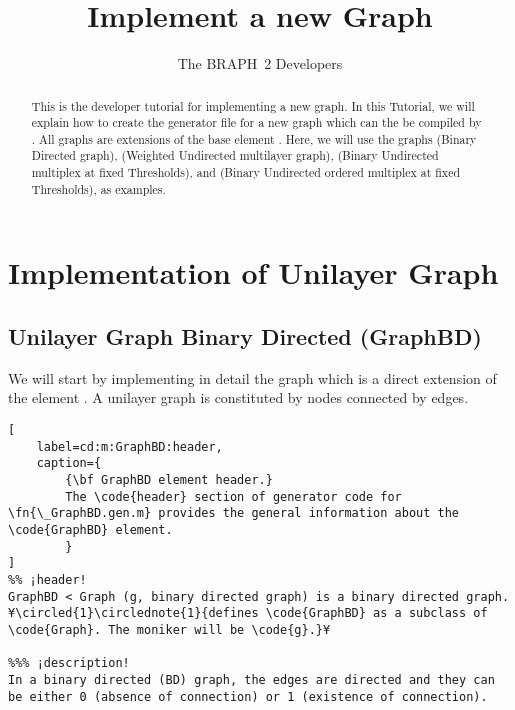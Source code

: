\documentclass{tufte-handout}
\title{Implement a new Graph}
\author[The BRAPH~2 Developers]{The BRAPH~2 Developers}
\begin{document}
\maketitle

\begin{abstract}
\noindent
This is the developer tutorial for implementing a new graph. 
In this Tutorial, we will explain how to create the generator file  for a new graph which can the be compiled by . All graphs are extensions of the base element . Here, we will use the graphs  (Binary Directed graph),  (Weighted Undirected multilayer graph),  (Binary Undirected multiplex at fixed Thresholds), and  (Binary Undirected ordered multiplex at fixed Thresholds), as examples.
\end{abstract}

\tableofcontents

\clearpage
\section{Implementation of Unilayer Graph}

\subsection{Unilayer Graph Binary Directed (GraphBD)}

We will start by implementing in detail the graph  which  is a direct extension of the element .
A unilayer graph is constituted by nodes connected by edges.

\begin{lstlisting}[
	label=cd:m:GraphBD:header,
	caption={
		{\bf GraphBD element header.}
		The \code{header} section of generator code for \fn{\_GraphBD.gen.m} provides the general information about the \code{GraphBD} element.
		}
]
%% ¡header!
GraphBD < Graph (g, binary directed graph) is a binary directed graph. ¥\circled{1}\circlednote{1}{defines \code{GraphBD} as a subclass of \code{Graph}. The moniker will be \code{g}.}¥

%%% ¡description!
In a binary directed (BD) graph, the edges are directed and they can be either 0 (absence of connection) or 1 (existence of connection).
\end{lstlisting}
\end{document}
